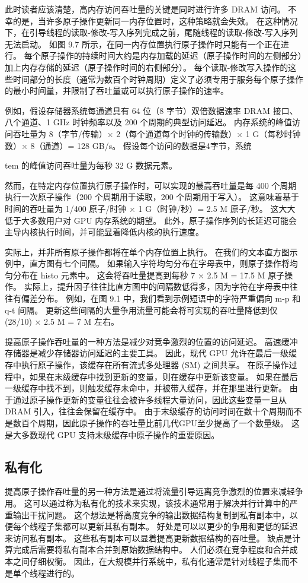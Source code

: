 此时读者应该清楚，高内存访问吞吐量的关键是同时进行许多 DRAM 访问。 不幸的是，当许多原子操作更新同一内存位置时，这种策略就会失效。 在这种情况下，在引导线程的读取-修改-写入序列完成之前，尾随线程的读取-修改-写入序列无法启动。 如图 9.7 所示，在同一内存位置执行原子操作时只能有一个正在进行。 每个原子操作的持续时间大约是内存加载的延迟（原子操作时间的左侧部分）加上内存存储的延迟（原子操作时间的右侧部分）。 每个读取-修改写入操作的这些时间部分的长度（通常为数百个时钟周期）定义了必须专用于服务每个原子操作的最小时间量，并限制了吞吐量或可以执行原子操作的速率。

例如，假设存储器系统每通道具有 64 位（8 字节）双倍数据速率 DRAM 接口、八个通道、1 GHz 时钟频率以及 200 个周期的典型访问延迟。 内存系统的峰值访问吞吐量为 8（字节/传输）× 2（每个通道每个时钟的传输数）× 1 G（每秒时钟数）× 8（通道）= 128 GB/s。 假设每个访问的数据是4字节，系统

tem 的峰值访问吞吐量为每秒 32 G 数据元素。

然而，在特定内存位置执行原子操作时，可以实现的最高吞吐量是每 400 个周期执行一次原子操作（200 个周期用于读取，200 个周期用于写入）。 这意味着基于时间的吞吐量为 1/400 原子/时钟 × 1 G（时钟/秒）= 2.5 M 原子/秒。 这大大低于大多数用户对 GPU 内存系统的期望。 此外，原子操作序列的长延迟可能会主导内核执行时间，并可能显着降低内核的执行速度。

实际上，并非所有原子操作都将在单个内存位置上执行。 在我们的文本直方图示例中，直方图有七个间隔。 如果输入字符均匀分布在字母表中，则原子操作将均匀分布在 histo 元素中。 这会将吞吐量提高到每秒 7 × 2.5 M = 17.5 M 原子操作。 实际上，提升因子往往比直方图中的间隔数低得多，因为字符在字母表中往往有偏差分布。 例如，在图 9.1 中，我们看到示例短语中的字符严重偏向 m-p 和 q-t 间隔。 更新这些间隔的大量争用流量可能会将可实现的吞吐量降低到仅 (28/10) × 2.5 M = 7 M 左右。

提高原子操作吞吐量的一种方法是减少对竞争激烈的位置的访问延迟。 高速缓冲存储器是减少存储器访问延迟的主要工具。 因此，现代 GPU 允许在最后一级缓存中执行原子操作，该缓存在所有流式多处理器 (SM) 之间共享。 在原子操作过程中，如果在末级缓存中找到更新的变量，则在缓存中更新该变量。 如果在最后一级缓存中找不到，则触发缓存未命中，并被带入缓存，并在那里进行更新。 由于通过原子操作更新的变量往往会被许多线程大量访问，因此这些变量一旦从 DRAM 引入，往往会保留在缓存中。 由于末级缓存的访问时间在数十个周期而不是数百个周期，因此原子操作的吞吐量比前几代GPU至少提高了一个数量级。 这是大多数现代 GPU 支持末级缓存中原子操作的重要原因。

\subsection{私有化}
提高原子操作吞吐量的另一种方法是通过将流量引导远离竞争激烈的位置来减轻争用。 这可以通过称为私有化的技术来实现，该技术通常用于解决并行计算中的严重输出干扰问题。 这个想法是将高度竞争的输出数据结构复制到私有副本中，以便每个线程子集都可以更新其私有副本。 好处是可以以更少的争用和更低的延迟来访问私有副本。 这些私有副本可以显着提高更新数据结构的吞吐量。 缺点是计算完成后需要将私有副本合并到原始数据结构中。 人们必须在竞争程度和合并成本之间仔细权衡。 因此，在大规模并行系统中，私有化通常是针对线程子集而不是单个线程进行的。

